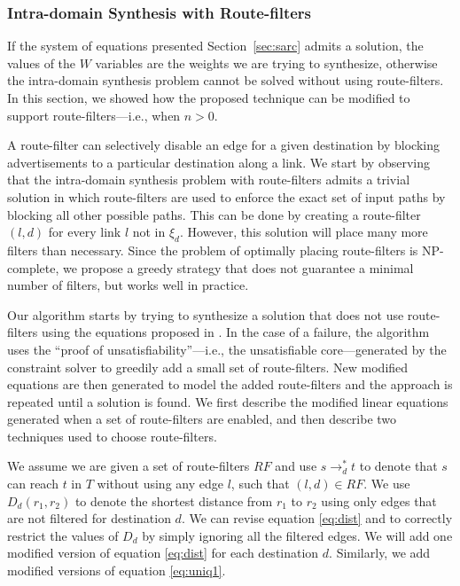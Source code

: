 \subsubsection{Intra-domain Synthesis with Route-filters} \label{sec:routefilter}

If the system of equations presented Section~\ref{sec:sarc} admits a solution, 
the values of the $W$ variables are the weights we are trying to synthesize,
otherwise the intra-domain synthesis problem cannot be solved without using route-filters.
In this section, we showed how the proposed technique can be modified
to support route-filters---i.e., when $n>0$.

A route-filter  can selectively disable an
edge for a given destination by  blocking advertisements to a
particular destination along a link.
We start by observing that the intra-domain synthesis problem with route-filters
admits a trivial solution in which 
route-filters are used to enforce the exact set of input paths by blocking all other possible paths.
This can be done by creating a 
route-filter $(l,d)$ for every link $l$ not in $\xi_d$. 
However, this solution will place many more filters than necessary.
Since the problem of optimally placing route-filters is NP-complete, 
we propose a greedy strategy that does not guarantee a minimal number of filters, but works well in practice.


Our algorithm starts by trying to synthesize a solution
that does not use route-filters using the equations proposed in . 
In the case of a failure, the algorithm uses the ``proof of unsatisfiability''---i.e., the unsatisfiable core---generated by 
the constraint solver 
to greedily add a small set of route-filters. 
New modified equations are then generated to model the added route-filters and the approach is repeated until a solution is found.
We first describe the 
modified linear equations generated when a set of
route-filters are enabled, and then describe two
techniques used to choose route-filters. 

We assume we are given a set of route-filters $RF$ and 
use $s\rightarrow_d^* t$ to denote that $s$ can reach $t$
in $T$ without using any edge $l$, such that $(l,d)\in RF$.
We use $D_d(r_1, r_2)$ to denote the shortest distance from $r_1$ to $r_2$
using only edges that are not filtered for destination $d$.
We can revise equation \eqref{eq:dist} and   to correctly restrict the values of $D_d$
by simply ignoring all the filtered edges. 
We will add one modified version of equation \eqref{eq:dist} for each destination $d$.
Similarly, we add modified versions of equation  \eqref{eq:uniq1}.

